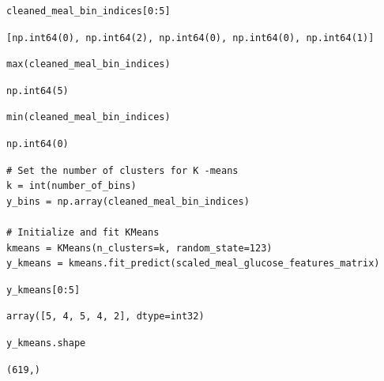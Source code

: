 \begin{verbatim}
cleaned_meal_bin_indices[0:5]
\end{verbatim}

\begin{verbatim}
[np.int64(0), np.int64(2), np.int64(0), np.int64(0), np.int64(1)]
\end{verbatim}

\begin{verbatim}
max(cleaned_meal_bin_indices)
\end{verbatim}

\begin{verbatim}
np.int64(5)
\end{verbatim}

\begin{verbatim}
min(cleaned_meal_bin_indices)
\end{verbatim}

\begin{verbatim}
np.int64(0)
\end{verbatim}

\begin{verbatim}
# Set the number of clusters for K -means
k = int(number_of_bins)
y_bins = np.array(cleaned_meal_bin_indices)

# Initialize and fit KMeans
kmeans = KMeans(n_clusters=k, random_state=123)
y_kmeans = kmeans.fit_predict(scaled_meal_glucose_features_matrix)
\end{verbatim}

\begin{verbatim}
y_kmeans[0:5]
\end{verbatim}

\begin{verbatim}
array([5, 4, 5, 4, 2], dtype=int32)
\end{verbatim}

\begin{verbatim}
y_kmeans.shape
\end{verbatim}

\begin{verbatim}
(619,)
\end{verbatim}

